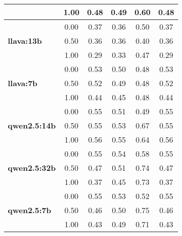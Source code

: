 \begin{table}[htbp]
\begin{tabular}{lccccc}
     & 1.00 & 0.48 & 0.49 & 0.60 & 0.48 \\
    \midrule
    \multirow{3}{*}{\textbf{llava:13b}} & 0.00 & 0.37 & 0.36 & 0.50 & 0.37 \\
     & 0.50 & 0.36 & 0.36 & 0.40 & 0.36 \\
     & 1.00 & 0.29 & 0.33 & 0.47 & 0.29 \\
    \midrule
    \multirow{3}{*}{\textbf{llava:7b}} & 0.00 & 0.53 & 0.50 & 0.48 & 0.53 \\
     & 0.50 & 0.52 & 0.49 & 0.48 & 0.52 \\
     & 1.00 & 0.44 & 0.45 & 0.48 & 0.44 \\
    \midrule
    \multirow{3}{*}{\textbf{qwen2.5:14b}} & 0.00 & 0.55 & 0.51 & 0.49 & 0.55 \\
     & 0.50 & 0.55 & 0.53 & 0.67 & 0.55 \\
     & 1.00 & 0.56 & 0.55 & 0.64 & 0.56 \\
    \midrule
    \multirow{3}{*}{\textbf{qwen2.5:32b}} & 0.00 & 0.55 & 0.54 & 0.58 & 0.55 \\
     & 0.50 & 0.47 & 0.51 & 0.74 & 0.47 \\
     & 1.00 & 0.37 & 0.45 & 0.73 & 0.37 \\
    \midrule
    \multirow{3}{*}{\textbf{qwen2.5:7b}} & 0.00 & 0.55 & 0.53 & 0.52 & 0.55 \\
     & 0.50 & 0.46 & 0.50 & 0.75 & 0.46 \\
     & 1.00 & 0.43 & 0.49 & 0.71 & 0.43 \\
    \bottomrule
  \end{tabular}
\end{table}